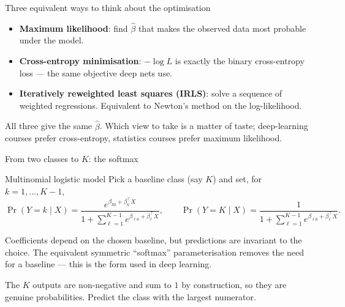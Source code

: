 \documentclass[aspectratio=169,11pt]{beamer}
\begin{document}
\begin{frame}{Three equivalent ways to think about the optimisation}
  \begin{itemize}
    \item \textbf{Maximum likelihood}: find $\hat\beta$ that makes the
          observed data most probable under the model.
    \item \textbf{Cross-entropy minimisation}: $-\log L$ is exactly the
          binary cross-entropy loss --- the same objective deep nets use.
    \item \textbf{Iteratively reweighted least squares (IRLS)}: solve a
          sequence of weighted regressions. Equivalent to Newton's
          method on the log-likelihood.
  \end{itemize}
  \begin{takeaway}
    All three give the same $\hat\beta$. Which view to take is a matter
    of taste; deep-learning courses prefer cross-entropy, statistics
    courses prefer maximum likelihood.
  \end{takeaway}
\end{frame}

\begin{frame}{From two classes to $K$: the softmax}
  \small
  \begin{block}{Multinomial logistic model}
    Pick a baseline class (say $K$) and set, for $k = 1,\dots,K-1$,
    \[
      \Pr(Y = k \mid X)
      = \frac{e^{\beta_{k0} + \beta_{k}^\top X}}
             {1 + \sum_{\ell=1}^{K-1} e^{\beta_{\ell 0} + \beta_\ell^\top X}},
      \qquad
      \Pr(Y = K \mid X)
      = \frac{1}
             {1 + \sum_{\ell=1}^{K-1} e^{\beta_{\ell 0} + \beta_\ell^\top X}}.
    \]
  \end{block}
  \begin{readme}
    Coefficients depend on the chosen baseline, but predictions are
    invariant to the choice. The equivalent symmetric ``softmax''
    parameterisation removes the need for a baseline --- this is the
    form used in deep learning.
  \end{readme}
  \begin{takeaway}
    The $K$ outputs are non-negative and sum to $1$ by construction, so
    they are genuine probabilities. Predict the class with the largest
    numerator.
  \end{takeaway}
\end{frame}
\end{document}
